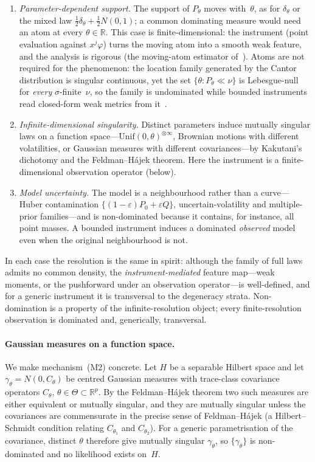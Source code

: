 \documentclass[11pt,a4paper]{article}
\newcommand{\R}{\mathbb{R}}
\begin{document}
\begin{enumerate}
\item[(M1)] \emph{Parameter-dependent support.}  The support of $P_\theta$
  moves with~$\theta$, as for $\delta_\theta$ or the mixed law
  $\tfrac12\delta_\theta+\tfrac12 N(0,1)$; a common dominating measure would
  need an atom at every $\theta\in\R$.  This case is finite-dimensional: the
  instrument (point evaluation against $x^j\varphi$) turns the moving atom into
  a smooth weak feature, and the analysis is rigorous (the moving-atom
  estimator of~\cite{B}).  Atoms are not required for the phenomenon:
  the location family generated by the Cantor distribution is singular
  continuous, yet the set $\{\theta : P_\theta \ll \nu\}$ is
  Lebesgue-null for \emph{every} $\sigma$-finite~$\nu$, so the family
  is undominated while bounded instruments read closed-form weak
  metrics from it~\cite{E}.
\item[(M2)] \emph{Infinite-dimensional singularity.}  Distinct parameters
  induce mutually singular laws on a function space---$\mathrm{Unif}(0,\theta)^{\otimes\infty}$,
  Brownian motions with different volatilities, or Gaussian measures with
  different covariances---by Kakutani's dichotomy and the Feldman--H\'ajek
  theorem.  Here the instrument is a finite-dimensional observation operator
  (below).
\item[(M3)] \emph{Model uncertainty.}  The model is a neighbourhood rather than
  a curve---Huber contamination $\{(1-\varepsilon)P_0+\varepsilon Q\}$,
  uncertain-volatility and multiple-prior families---and is non-dominated
  because it contains, for instance, all point masses.  A bounded instrument
  induces a dominated \emph{observed} model even when the original neighbourhood
  is not.
\end{enumerate}

In each case the resolution is the same in spirit: although the family of full
laws admits no common density, the \emph{instrument-mediated} feature
map---weak moments, or the pushforward under an observation operator---is
well-defined, and for a generic instrument it is transversal to the degeneracy
strata.  Non-domination is a property of the infinite-resolution object; every
finite-resolution observation is dominated and, generically, transversal.

\paragraph{Gaussian measures on a function space.}
We make mechanism~(M2) concrete.  Let $H$ be a separable Hilbert space and let
$\gamma_\theta = N(0, C_\theta)$ be centred Gaussian measures with trace-class
covariance operators $C_\theta$, $\theta\in\Theta\subset\R^p$.  By the
Feldman--H\'ajek theorem two such measures are either equivalent or mutually
singular, and they are mutually singular unless the covariances are
commensurate in the precise sense of Feldman--H\'ajek (a Hilbert--Schmidt
condition relating $C_{\theta_1}$ and $C_{\theta_2}$).  For a generic
parametrisation of the covariance, distinct $\theta$ therefore give mutually
singular $\gamma_\theta$, so $\{\gamma_\theta\}$ is non-dominated and no
likelihood exists on~$H$.
\end{document}
